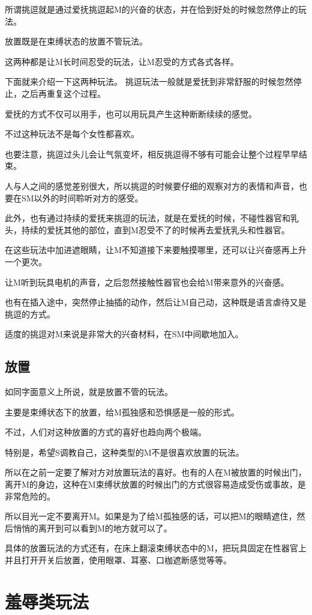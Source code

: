 \documentclass[12pt,UTF8]{ctexbook}
\begin{document}
所谓挑逗就是通过爱抚挑逗起M的兴奋的状态，并在恰到好处的时候忽然停止的玩法。

放置既是在束缚状态的放置不管玩法。

这两种都是让M长时间忍受的玩法，让M忍受的方式各式各样。

下面就来介绍一下这两种玩法。 挑逗玩法一般就是爱抚到非常舒服的时候忽然停止，之后再重复这个过程。

爱抚的方式不仅可以用手，也可以用玩具产生这种断断续续的感觉。

不过这种玩法不是每个女性都喜欢。

也要注意，挑逗过头儿会让气氛变坏，相反挑逗得不够有可能会让整个过程早早结束。

人与人之间的感觉差别很大，所以挑逗的时候要仔细的观察对方的表情和声音，也要在SM以外的时间聆听对方的感受。

此外，也有通过持续的爱抚来挑逗的玩法，就是在爱抚的时候，不碰性器官和乳头，持续的爱抚其他的部位，直到M忍受不了的时候再去爱抚乳头和性器官。

在这些玩法中加进遮眼睛，让M不知道接下来要触摸哪里，还可以让兴奋感再上升一个更次。

让M听到玩具电机的声音，之后忽然接触性器官也会给M带来意外的兴奋感。

也有在插入途中，突然停止抽插的动作，然后让M自己动，这种既是语言虐待又是挑逗的方式。

适度的挑逗对M来说是非常大的兴奋材料，在SM中间歇地加入。

\subsection{放置}

如同字面意义上所说，就是放置不管的玩法。

主要是束缚状态下的放置，给M孤独感和恐惧感是一般的形式。

不过，人们对这种放置的方式的喜好也趋向两个极端。

特别是，希望S调教自己，这种类型的M不是很喜欢放置的玩法。

所以在之前一定要了解对方对放置玩法的喜好。也有的人在M被放置的时候出门，离开M的身边，这种在M束缚状放置的时候出门的方式很容易造成受伤或事故，是非常危险的。

所以目光一定不要离开M。如果是为了给M孤独感的话，可以把M的眼睛遮住，然后悄悄的离开到可以看到M的地方就可以了。

具体的放置玩法的方式还有，在床上翻滚束缚状态中的M，把玩具固定在性器官上并且打开开关后放置，使用眼罩、耳塞、口枷遮断感觉等等。 

\section{羞辱类玩法}
\end{document}
